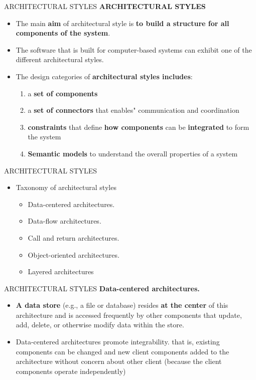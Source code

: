 \documentclass{beamer}
\begin{document}
\begin{frame}{ARCHITECTURAL STYLES}
	\textbf{ARCHITECTURAL STYLES}
	\begin{itemize}
		\item The main \textbf{aim} of architectural style is \textbf{to build a structure for all components of the system}.
		\item The software that is built for computer-based systems can exhibit one of the different architectural styles. 
		\item The design categories of \textbf{architectural styles includes}:
		\begin{enumerate}
			\item a \textbf{set of components}
			\item a \textbf{set of connectors} that enables" communication and coordination
			\item \textbf{constraints} that define \textbf{how components} can be \textbf{integrated} to form the system
			\item \textbf{Semantic models} to understand the overall properties of a system
		\end{enumerate}
	\end{itemize}
\end{frame}
\begin{frame}{ARCHITECTURAL STYLES}
	\begin{itemize}
		\item Taxonomy of architectural styles
		\begin{itemize}
			\item Data-centered architectures. 
			\item Data-flow architectures.
			\item Call and return architectures.
			\item Object-oriented architectures.
			\item Layered architectures
		\end{itemize}
	\end{itemize}
\end{frame}
\begin{frame}{ARCHITECTURAL STYLES}
	\textbf{Data-centered architectures. }
	\begin{itemize}
		\item \textbf{A data store} (e.g., a file or database) resides \textbf{at the 
			center} of this architecture and is accessed frequently by other components that 
		update, add, delete, or otherwise modify data within the store. 
		\item Data-centered architectures promote integrability. that is, existing components can be changed and new client components added to the architecture without concern about other client (because the client components operate independently) 
	\end{itemize}
\end{frame}
\end{document}

